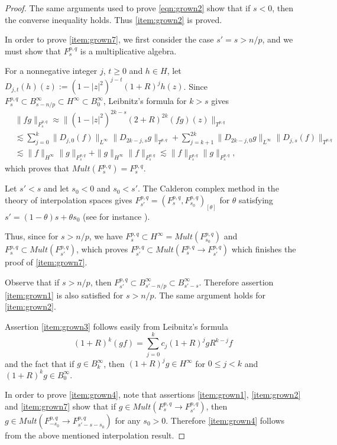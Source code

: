 \documentclass[12pt,twoside,leqno,final]{amsart}
\theoremstyle{plain}
\begin{document}
\begin{proof}
 
The same arguments  used to prove \eqref{eqn:grown2} show that if $s<0$, 
then the converse inequality holds. Thus \eqref{item:grown2} is proved.

In order to prove \eqref{item:grown7},  we first consider the case $s'=s>n/p$, and we must show that $F^{p,q}_s$ is a multiplicative algebra.

For a nonnegative integer $j$, $t\ge 0$ and $h\in H$, 
let $D_{j,t}(h)(z):=(1-|z|^2)^{j-t}(1+R)^j h(z)$. 
Since $F^{p,q}_s\subset B^\infty_{s-n/p}\subset H^\infty\subset B^\infty_0$, Leibnitz's formula for $k>s$ gives 
\begin{align*}
&\|fg\|_{F^{p,q}_s}\approx \|(1-|z|^2)^{2k-s}(2+R)^{2k}(fg)(z)\|_{T^{p,q}}\\
&\lesssim\sum_{j=0}^{k} \|D_{j,0}(f)\|_{L^\infty} \|D_{2k-j,s}g\|_{T^{p,q}}
+\sum_{j=k+1}^{2k} \|D_{2k-j,0}g\|_{L^\infty} \|D_{j,s} (f)\|_{T^{p,q}}\\
&\lesssim \|f\|_{H^\infty}\|g\|_{F^{p,q}_s}+
\|g\|_{H^\infty}\|f\|_{F^{p,q}_s}\lesssim \|f\|_{F^{p,q}_s}\|g\|_{F^{p,q}_s},
\end{align*}
which proves that $Mult(F^{p,q}_s)=F^{p,q}_s$.

Let $s'<s$ and let $s_0<0$ and $s_0<s'$. The Calderon complex method in the theory of interpolation spaces gives  
$F^{p,q}_{s'}=(F^{p,q}_s,F^{p,q}_{s_0})_{[\theta]}$ for $\theta$ satisfying $s'=(1-\theta)s+\theta s_0$
(see for instance \cite[Corollary 3.4]{Or-Fa1}). 

Thus, since for $s>n/p$, we have $F^{p,q}_s\subset H^\infty=Mult(F^{p,q}_{s_0})$ 
and $F^{p,q}_s\subset Mult(F^{p,q}_{s'})$, which proves  
$F^{p,q}_{s'}\subset Mult(F^{p,q}_{s}\to F^{p,q}_{s'})$ which finishes the proof of \eqref{item:grown7}.

Observe that if $s>n/p$, then $F^{p,q}_{s'}\subset B^\infty_{s'-n/p}\subset B^\infty_{s'-s}$. Therefore assertion \eqref{item:grown1} is also satisfied for $s>n/p$. The same argument holds for \eqref{item:grown2}.

Assertion \eqref{item:grown3} follows easily from Leibnitz's formula
\begin{equation}\label{eqn:Leibnitz}
(1+R)^k(gf)=\sum_{j=0}^k c_j (1+R)^j g R^{k-j}f\,
\end{equation}
and the fact that if $g\in B^\infty_k$, 
then $(1+R)^jg\in H^\infty$ for $0\le j<k$ and $(1+R)^k g\in B^\infty_0$.
 
In order to prove \eqref{item:grown4}, note that assertions 
\eqref{item:grown1}, \eqref{item:grown2} and \eqref{item:grown7} 
show that if $g \in Mult(F^{p,q}_s\to F^{p,q}_{s'})$,  
then $g\in Mult(F^{p,q}_{-s_0}\to F^{p,q}_{s'-s-s_0})$ for any $s_0>0$. Therefore \eqref{item:grown4} follows from the above mentioned interpolation result.


\end{proof}
\end{document}

